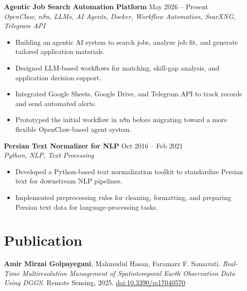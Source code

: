 \documentclass[a4paper,10pt]{article}
\newcommand{\resumeSubheading}[4]{
    \textbf{#1} \hfill #2 \\
    \textit{#3} \hfill \textit{#4}
}
\begin{document}
\noindent
\textbf{Agentic Job Search Automation Platform} \hfill May 2026 -- Present \\
\textit{OpenClaw, n8n, LLMs, AI Agents, Docker, Workflow Automation, SearXNG, Telegram API}
\begin{itemize}[leftmargin=0.25in]
    \item Building an agentic AI system to search jobs, analyze job fit, and generate tailored application materials.
    \item Designed LLM-based workflows for matching, skill-gap analysis, and application decision support.
    \item Integrated Google Sheets, Google Drive, and Telegram API to track records and send automated alerts.
    \item Prototyped the initial workflow in n8n before migrating toward a more flexible OpenClaw-based agent system.
\end{itemize}

\noindent
\textbf{Persian Text Normalizer for NLP} \hfill Oct 2016 -- Feb 2021 \\
\textit{Python, NLP, Text Processing}
\begin{itemize}[leftmargin=0.25in]
    \item Developed a Python-based text normalization toolkit to standardize Persian text for downstream NLP pipelines.
    \item Implemented preprocessing rules for cleaning, formatting, and preparing Persian text data for language-processing tasks.
\end{itemize}

\section*{Publication}

\textbf{Amir Mirzai Golpayegani}, Mahmudul Hasan, Faramarz F. Samavati. 
\textit{Real-Time Multiresolution Management of Spatiotemporal Earth Observation Data Using DGGS}. 
Remote Sensing, 2025. \href{https://doi.org/10.3390/rs17040570}{doi:10.3390/rs17040570}



\end{document}
